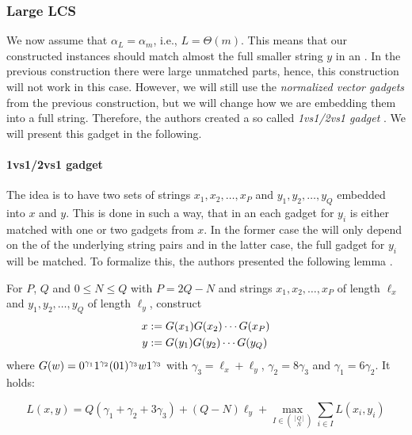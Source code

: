 \subsubsection{Large LCS}

We now assume that $\alpha_L = \alpha_m$, i.e., $L = \Theta(m)$.
This means that our constructed instances should match almost the full smaller string $y$ in an \lcs{}.
In the previous construction there were large unmatched parts, hence, this construction will not work in this case.
However, we will still use the \emph{normalized vector gadgets} from the previous construction, but we will change how we are embedding them into a full string.
Therefore, the authors created a so called \emph{1vs1/2vs1 gadget} \cite[section 9.2.1]{Bringman.2018}.
We will present this gadget in the following.

\paragraph{1vs1/2vs1 gadget}
The idea is to have two sets of strings $x_1, x_2, \ldots, x_P$ and $y_1, y_2, \ldots, y_Q$ embedded into $x$ and $y$.
This is done in such a way, that in an \lcs{} each gadget for $y_i$ is either matched with one or two gadgets from $x$.
In the former case the \lcs{} will only depend on the \lcs{} of the underlying string pairs and in the latter case, the full gadget for $y_i$ will be matched.
To formalize this, the authors presented the following lemma \cite[Lemma 9.6]{Bringman.2018}.



\begin{lemma}[see ]
For $P$, $Q$ and $0 \leq N \leq Q$ with $P = 2Q - N$ and strings $x_1, x_2, \ldots, x_P$ of length $\ell_x$ and $y_1, y_2, \ldots, y_Q$ of length $\ell_y$, construct
\begin{align*}
	x &:= G(x_1)G(x_2) \cdots G(x_P)\\
	y &:= G(y_1)G(y_2) \cdots G(y_Q)
\end{align*}
where $G(w) = 0^{\gamma_1}1^{\gamma_2}(01)^{\gamma_3}w1^{\gamma_3}$ with $\gamma_3 = \ell_x + \ell_y$, $\gamma_2 = 8\gamma_3$ and $\gamma_1 = 6\gamma_2$. 
It holds:

\[
L(x,y) = Q(\gamma_1 + \gamma_2 + 3\gamma_3) + (Q - N)\ell_y + \max_{I \in \binom{[Q]}{N}} \sum_{i \in I} L(x_i, y_i)
\]
\end{lemma}

